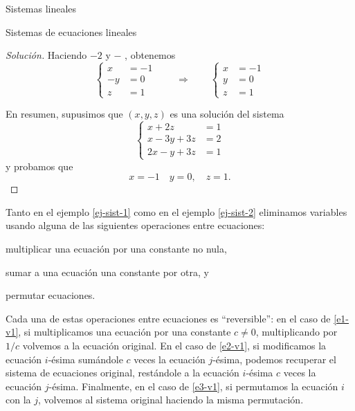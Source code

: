\begin{chapter}{Sistemas lineales}
\begin{section}{Sistemas de ecuaciones lineales}
\begin{proof}[Solución]
 Haciendo {\footnotesize{}} $- 2$ {\footnotesize{}} y {\footnotesize{}} $-$ {\footnotesize{}}, obtenemos 
\begin{equation*}
    \begin{cases}
        x  & = -1 \\
        -y  & =0 \\
        z & = 1
    \end{cases} 
    \qquad \Rightarrow\qquad
    \begin{cases}
        x & = -1 \\
    y & =0 \\
    z & = 1
    \end{cases}
\end{equation*}

En resumen, supusimos que $(x,y,z)$ es una solución del sistema
\begin{equation*}
\begin{cases}
    x  +2z & = 1 \\
    x -3y  +3z & =2 \\
    2x -y  +3z & =1
\end{cases}
\end{equation*}
y probamos que 
\begin{equation*}
x=-1\quad y=0,\quad z=1. 
\end{equation*}
\end{proof}

Tanto en el ejemplo \ref{ej-sist-1} como en el ejemplo \ref{ej-sist-2} eliminamos variables usando alguna de las siguientes operaciones entre ecuaciones:
    \begin{enumelem}
        \item\label{e1-v1} multiplicar una ecuación por una constante no nula,  
        \item\label{e2-v1} sumar a una ecuación una constante por otra, y
        \item\label{e3-v1} permutar ecuaciones.  
    \end{enumelem}
    
Cada una de estas operaciones entre ecuaciones es  ``reversible'': en el caso de \ref{e1-v1}, si multiplicamos una ecuación por una constante $c\ne 0$, multiplicando por $1/c$ volvemos a la ecuación original.  En el caso de \ref{e2-v1}, si modificamos la ecuación $i$-ésima sumándole $c$ veces la ecuación $j$-ésima, podemos recuperar el sistema de ecuaciones original, restándole a la ecuación $i$-ésima  $c$ veces la ecuación $j$-ésima. Finalmente, en el caso  de  \ref{e3-v1}, si permutamos la ecuación $i$  con la $j$,  volvemos al sistema original haciendo la misma permutación. 



\end{section}
\end{chapter}
